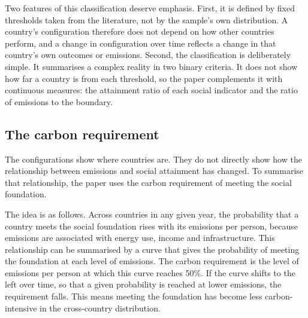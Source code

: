 Two features of this classification deserve emphasis. First, it is defined by fixed thresholds taken from the literature, not by the sample's own distribution. A country's configuration therefore does not depend on how other countries perform, and a change in configuration over time reflects a change in that country's own outcomes or emissions. Second, the classification is deliberately simple. It summarises a complex reality in two binary criteria. It does not show how far a country is from each threshold, so the paper complements it with continuous measures: the attainment ratio of each social indicator and the ratio of emissions to the boundary.

\subsection{The carbon requirement}

The configurations show where countries are. They do not directly show how the relationship between emissions and social attainment has changed. To summarise that relationship, the paper uses the carbon requirement of meeting the social foundation.

The idea is as follows. Across countries in any given year, the probability that a country meets the social foundation rises with its emissions per person, because emissions are associated with energy use, income and infrastructure. This relationship can be summarised by a curve that gives the probability of meeting the foundation at each level of emissions. The carbon requirement is the level of emissions per person at which this curve reaches 50\%. If the curve shifts to the left over time, so that a given probability is reached at lower emissions, the requirement falls. This means meeting the foundation has become less carbon-intensive in the cross-country distribution.

